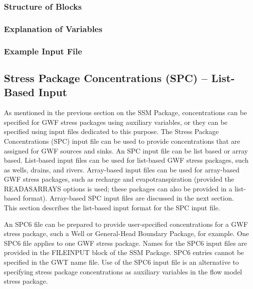 \vspace{5mm}
\subsubsection{Structure of Blocks}




\vspace{5mm}
\subsubsection{Explanation of Variables}
\begin{description}

\end{description}

\vspace{5mm}
\subsubsection{Example Input File}



\newpage
\subsection{Stress Package Concentrations (SPC) -- List-Based Input}
As mentioned in the previous section on the SSM Package, concentrations can be specified for GWF stress packages using auxiliary variables, or they can be specified using input files dedicated to this purpose.  The Stress Package Concentrations (SPC) input file can be used to provide concentrations that are assigned for GWF sources and sinks.  An SPC input file can be list based or array based.  List-based input files can be used for list-based GWF stress packages, such as wells, drains, and rivers.  Array-based input files can be used for array-based GWF stress packages, such as recharge and evapotranspiration (provided the READASARRAYS options is used; these packages can also be provided in a list-based format).  Array-based SPC input files are discussed in the next section.  This section describes the list-based input format for the SPC input file.  

An SPC6 file can be prepared to provide user-specified concentrations for a GWF stress package, such a Well or General-Head Boundary Package, for example.  One SPC6 file applies to one GWF stress package.  Names for the SPC6 input files are provided in the FILEINPUT block of the SSM Package.  SPC6 entries cannot be specified in the GWT name file.  Use of the SPC6 input file is an alternative to specifying stress package concentrations as auxiliary variables in the flow model stress package.  

